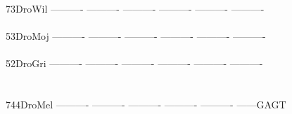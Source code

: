 \documentclass[11pt,twoside,reqno,a4paper]{article}
\begin{document}
{73\hspace*{3\charwidth}DroWil	----------	----------	----------	----------	----------	----------	\\
\hspace*{5\charwidth}\hspace*{7\charwidth}\hspace*{1\charwidth}\hspace*{1\charwidth}\hspace*{1\charwidth}\hspace*{1\charwidth}\hspace*{1\charwidth}\hspace*{1\charwidth}\\
53\hspace*{3\charwidth}DroMoj	----------	----------	----------	----------	----------	----------	\\
\hspace*{5\charwidth}\hspace*{7\charwidth}\hspace*{1\charwidth}\hspace*{1\charwidth}\hspace*{1\charwidth}\hspace*{1\charwidth}\hspace*{1\charwidth}\hspace*{1\charwidth}\\
52\hspace*{3\charwidth}DroGri	----------	----------	----------	----------	----------	----------	\\
\hspace*{5\charwidth}\hspace*{7\charwidth}\hspace*{1\charwidth}\hspace*{1\charwidth}\hspace*{1\charwidth}\hspace*{1\charwidth}\hspace*{1\charwidth}\hspace*{1\charwidth}\\
\\
744\hspace*{2\charwidth}DroMel	----------	----------	----------	----------	----------	------GAGT	\\
\hspace*{5\charwidth}\hspace*{7\charwidth}\hspace*{1\charwidth}\hspace*{1\charwidth}\hspace*{1\charwidth}\hspace*{1\charwidth}\hspace*{1\charwidth}\hspace*{1\charwidth}\\
}
\end{document}
